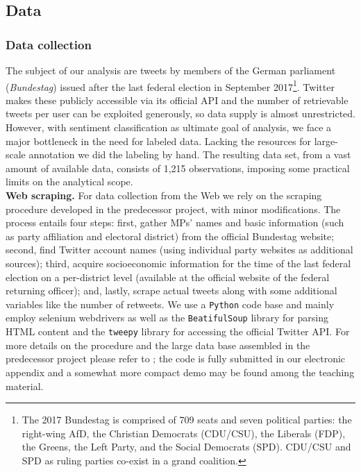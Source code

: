 \subsection{Data}
\label{data}


\subsubsection{Data collection}
\label{data_collection}

The subject of our analysis are tweets by members of the German parliament
(\textit{Bundestag}) issued after the last federal election in September 
2017\footnote{
The 2017 Bundestag is comprised of 709 seats and seven political parties: the 
right-wing AfD, the Christian Democrats (CDU/CSU), the Liberals (FDP), the 
Greens, the Left Party, and the Social Democrats (SPD).
CDU/CSU and SPD as ruling parties co-exist in a grand coalition.
}.
Twitter makes these publicly accessible via its official API and the number of 
retrievable tweets per user can be exploited generously, so data supply is 
almost unrestricted.
However, with sentiment classification as ultimate goal of analysis, we face a 
major bottleneck in the need for labeled data.
Lacking the resources for large-scale annotation we did the labeling by hand.
The resulting data set, from a vast amount of available data, consists of 1,215 
observations, imposing some practical limits on the analytical scope.
\\

\textbf{Web scraping.}
For data collection from the Web we rely on the scraping procedure developed in 
the predecessor project, with minor modifications.
The process entails four steps: first, gather MPs' names and basic information 
(such as party affiliation and electoral district) from the official Bundestag 
website; second, find Twitter account names (using individual party websites as 
additional sources); 
third, acquire socioeconomic information for the time of the last 
federal election on a per-district level (available at the official website of 
the federal returning officer); and, lastly, scrape actual tweets along with 
some additional variables like the number of retweets.
We use a \texttt{Python} code base and mainly employ selenium webdrivers as well
as the \texttt{BeatifulSoup} library \citep{richardson2007} for parsing HTML
content and the \texttt{tweepy} library \citep{roesslein2020} for accessing the
official Twitter API.
For more details on the procedure and the large data base assembled in the 
predecessor project please refer to \citet{schulzewiegrebe2020}; the code is 
fully submitted in our electronic appendix and a somewhat more compact demo may 
be found among the teaching material.
\\

